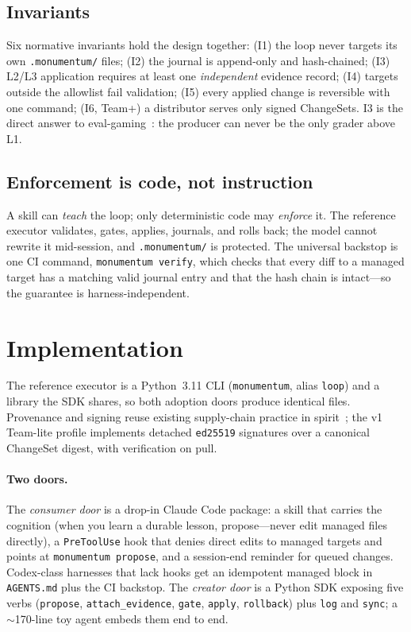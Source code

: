 \documentclass[10pt,twocolumn]{article}
\begin{document}
\subsection{Invariants}
Six normative invariants hold the design together: (I1) the loop never
targets its own \texttt{.monumentum/} files; (I2) the journal is append-only and
hash-chained; (I3) L2/L3 application requires at least one
\emph{independent} evidence record; (I4) targets outside the allowlist
fail validation; (I5) every applied change is reversible with one command;
(I6, Team+) a distributor serves only signed ChangeSets. I3 is the direct
answer to eval-gaming~\cite{dgm}: the producer can never be the only
grader above L1.

\subsection{Enforcement is code, not instruction}
A skill can \emph{teach} the loop; only deterministic code may
\emph{enforce} it. The reference executor validates, gates, applies,
journals, and rolls back; the model cannot rewrite it mid-session, and
\texttt{.monumentum/} is protected. The universal backstop is one CI command,
\texttt{monumentum verify}, which checks that every diff to a managed target
has a matching valid journal entry and that the hash chain is intact---so
the guarantee is harness-independent.

\section{Implementation}
\label{sec:impl}
The reference executor is a Python~3.11 CLI (\texttt{monumentum}, alias
\texttt{loop}) and a library the SDK shares, so both adoption doors produce
identical files. Provenance and signing reuse existing supply-chain
practice in spirit~\cite{intoto,slsa,sigstore}; the v1 Team-lite profile
implements detached \texttt{ed25519} signatures over a canonical
ChangeSet digest, with verification on pull.

\paragraph{Two doors.} The \emph{consumer door} is a drop-in Claude Code
package: a skill that carries the cognition (when you learn a durable
lesson, propose---never edit managed files directly), a \texttt{PreToolUse}
hook that denies direct edits to managed targets and points at
\texttt{monumentum propose}, and a session-end reminder for queued changes.
Codex-class harnesses that lack hooks get an idempotent managed block in
\texttt{AGENTS.md} plus the CI backstop. The \emph{creator door} is a
Python SDK exposing five verbs (\texttt{propose}, \texttt{attach\_evidence},
\texttt{gate}, \texttt{apply}, \texttt{rollback}) plus \texttt{log} and
\texttt{sync}; a $\sim$170-line toy agent embeds them end to end.
\end{document}
